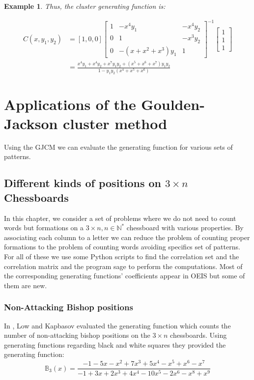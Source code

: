 \documentclass[12pt]{report}
\newtheorem{exa}[mythm]{Example}
\begin{document}
{{\begin{exa}
Thus, the cluster generating function is:

\begin{align*}
C(x,y_1,y_2)
&= [1,0,0] \begin{bmatrix}
	1 & -x^4 y_1 & -x^4 y_2 \\
    0 & 1 & -x^3 y_2 \\
    0 &-(x+x^2 + x^3)y_1 & 1
\end{bmatrix}^{-1} \begin{bmatrix}
    1\\
    1\\
    1
\end{bmatrix}\\
&= \frac{x^4 y_1 + x^4 y_2 + x^7 y_1 y_2 + (x^5 + x^6 + x^7)y_1 y_2}{1-y_1 y_2 (x^4 + x^5 + x^6)}
\end{align*}
\end{exa}





\chapter{Applications of the Goulden-Jackson cluster method}

\noindent Using the GJCM we can evaluate the generating function for various sets of patterns.

\section{Different kinds of positions on $3 \times n$ Chessboards}

\noindent In this chapter, we consider a set of problems where we do not need to count words but formations on a $3\times n, n \in \mathbb{N}^*$ chessboard with various properties. By associating each column to a letter we can reduce the problem of counting proper formations to the problem of counting words avoiding specifics set of patterns. For all of these we use some Python scripts to find the correlation set and the correlation matrix and the program sage to perform the computations. Most of the corresponding generating functions' coefficients appear in OEIS but some of them are new.

\subsection{Non-Attacking Bishop positions}

In \cite{LK2017}, Low and Kapbasov evaluated the generating function which counts the number of non-attacking bishop positions on the $3 \times n$ chessboards. Using generating functions regarding black and white squares they provided the generating function: \[\mathbb{B}_3(x)=\frac{-1-5x-x^2+7x^3+5x^4-x^5+x^6-x^7}{-1+3x+2x^3+4x^4-10x^5-2x^6-x^8+x^9}\]

}}
\end{document}

